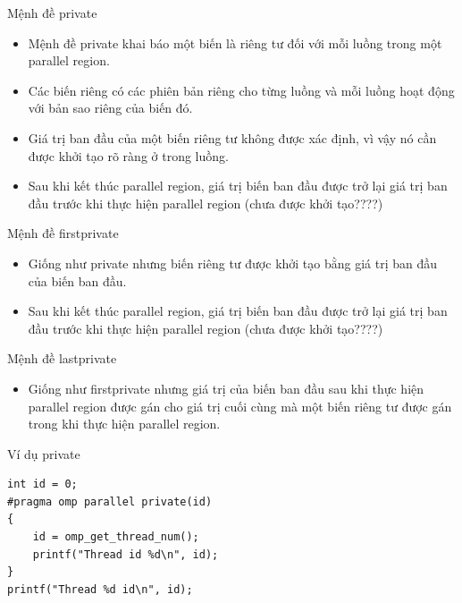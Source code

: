 \documentclass[10pt]{beamer}
\theoremstyle{remark}
\numberwithin{algocf}{section}
\numberwithin{equation}{section}
\numberwithin{dl}{section}
\numberwithin{figure}{section}
\begin{document}
\begin{frame}{Mệnh đề private}
    \begin{itemize}
        \item Mệnh đề private khai báo một biến là riêng tư đối với mỗi luồng trong một parallel region.
        \item Các biến riêng có các phiên bản riêng cho từng luồng và mỗi luồng hoạt động với bản sao riêng của biến đó.
        \item Giá trị ban đầu của một biến riêng tư không được xác định, vì vậy nó cần được khởi tạo rõ ràng ở trong luồng.
        \item Sau khi kết thúc parallel region, giá trị biến ban đầu được trở lại giá trị ban đầu trước khi thực hiện parallel region (chưa được khởi tạo????)
    \end{itemize}
\end{frame}

\begin{frame}{Mệnh đề firstprivate}
    \begin{itemize}
        \item Giống như private nhưng biến riêng tư được khởi tạo bằng giá trị ban đầu của biến ban đầu.
        \item Sau khi kết thúc parallel region, giá trị biến ban đầu được trở lại giá trị ban đầu trước khi thực hiện parallel region (chưa được khởi tạo????)
    \end{itemize}
\end{frame}

\begin{frame}{Mệnh đề lastprivate}
    \begin{itemize}
        \item Giống như firstprivate nhưng giá trị của biến ban đầu sau khi thực hiện parallel region được gán cho giá trị cuối cùng mà một biến riêng tư được gán trong khi thực hiện parallel region.
    \end{itemize}
\end{frame}

\begin{frame}[fragile]{Ví dụ private}
    \begin{verbatim}
int id = 0;
#pragma omp parallel private(id)
{
    id = omp_get_thread_num();
    printf("Thread id %d\n", id);
}
printf("Thread %d id\n", id);
    \end{verbatim}
\end{frame}
\end{document}
